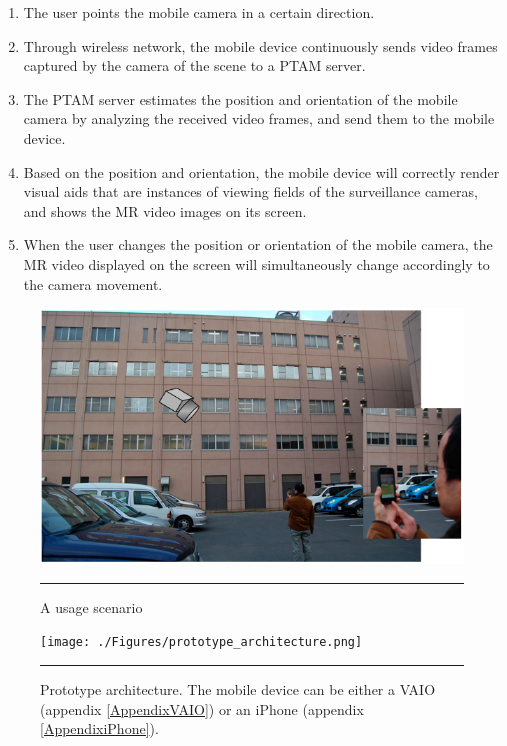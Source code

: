 \begin{enumerate}
	\item The user points the mobile camera in a certain direction.
	\item Through wireless network, the mobile device continuously sends video frames captured by the camera of the scene to a PTAM server.
	\item The PTAM server estimates the position and orientation of the mobile camera by analyzing the received video frames, and send them to the mobile device.
	\item Based on the position and orientation, the mobile device will correctly render visual aids that are instances of viewing fields of the surveillance cameras, and shows the MR video images on its screen.
	\item When the user changes the position or orientation of the mobile camera, the MR video displayed on the screen will simultaneously change accordingly to the camera movement.
\end{enumerate}

\begin{figure}[htbp]
	\centering
	\includegraphics[width=14cm]{./Primitives/usecase.png}
	\rule{35em}{0.5pt}
	\caption[Usage scenario]{A usage scenario}
	\label{fig:UseCase}
\end{figure}

\begin{figure}[htbp]
	\centering
	\texttt{[image: ./Figures/prototype\_architecture.png]}
	\rule{35em}{0.5pt}
	\caption[Prototype architecture]{Prototype architecture. The mobile device can be either a VAIO (appendix \ref{AppendixVAIO}) or an iPhone (appendix \ref{AppendixiPhone}).}
	\label{fig:PrototypeArchitecture}
\end{figure}

